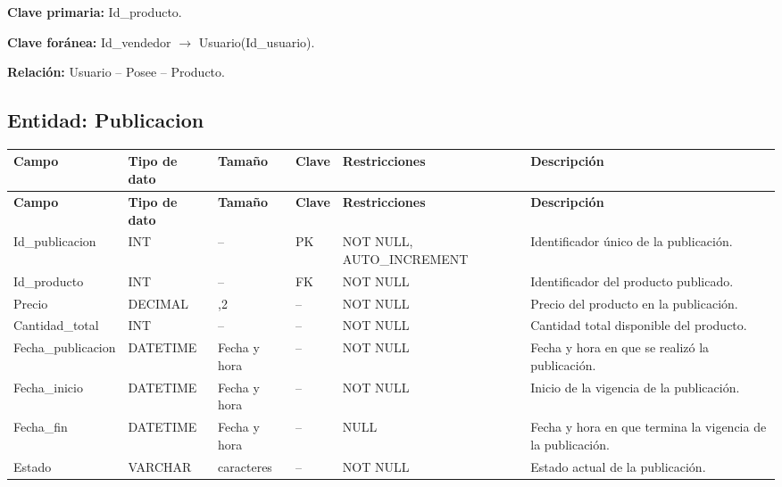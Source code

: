 \documentclass[12pt]{article} %
\begin{document}
\textbf{Clave primaria:} Id\_producto.

\textbf{Clave foránea:}
Id\_vendedor $\rightarrow$ Usuario(Id\_usuario).

\textbf{Relación:}
Usuario -- Posee -- Producto.



\subsection{Entidad: Publicacion}

\begin{longtable}{>{\raggedright\arraybackslash}p{2.5cm}
                  >{\raggedright\arraybackslash}p{2.0cm}
                  >{\raggedright\arraybackslash}p{2.2cm}
                  >{\raggedright\arraybackslash}p{1.2cm}
                  >{\raggedright\arraybackslash}p{3.0cm}
                  >{\raggedright\arraybackslash}p{4.0cm}}
\toprule
\textbf{Campo} &
\textbf{Tipo de dato} &
\textbf{Tamaño} &
\textbf{Clave} &
\textbf{Restricciones} &
\textbf{Descripción} \\
\midrule
\endfirsthead

\toprule
\textbf{Campo} &
\textbf{Tipo de dato} &
\textbf{Tamaño} &
\textbf{Clave} &
\textbf{Restricciones} &
\textbf{Descripción} \\
\midrule
\endhead

Id\_publicacion &
INT &
-- &
PK &
NOT NULL, AUTO\_INCREMENT &
Identificador único de la publicación. \\

Id\_producto &
INT &
-- &
FK &
NOT NULL &
Identificador del producto publicado. \\

Precio &
DECIMAL &
10,2 &
-- &
NOT NULL &
Precio del producto en la publicación. \\

Cantidad\_total &
INT &
-- &
-- &
NOT NULL &
Cantidad total disponible del producto. \\

Fecha\_publicacion &
DATETIME &
Fecha y hora &
-- &
NOT NULL &
Fecha y hora en que se realizó la publicación. \\

Fecha\_inicio &
DATETIME &
Fecha y hora &
-- &
NOT NULL &
Inicio de la vigencia de la publicación. \\

Fecha\_fin &
DATETIME &
Fecha y hora &
-- &
NULL &
Fecha y hora en que termina la vigencia de la publicación. \\

Estado &
VARCHAR &
20 caracteres &
-- &
NOT NULL &
Estado actual de la publicación. \\

\bottomrule
\end{longtable}
\end{document}
